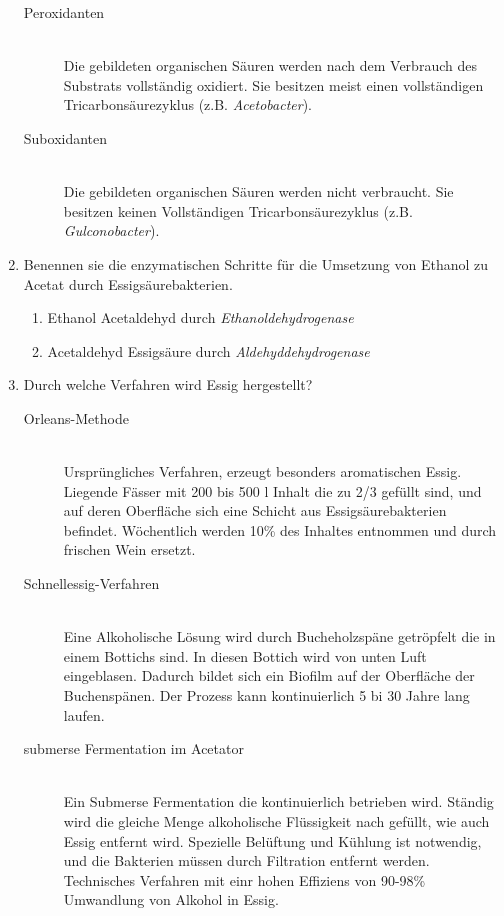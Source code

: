 \begin{enumerate}
		\begin{description}
			\item[Peroxidanten] \hfill \\
				Die gebildeten organischen Säuren werden nach dem Verbrauch des Substrats vollständig oxidiert.
				Sie besitzen meist einen vollständigen Tricarbonsäurezyklus (z.B. \emph{Acetobacter}).
			\item[Suboxidanten] \hfill \\
				Die gebildeten organischen Säuren werden nicht verbraucht.
				Sie besitzen keinen Vollständigen Tricarbonsäurezyklus (z.B. \emph{Gulconobacter}).
		\end{description}
		
	\item Benennen sie die enzymatischen Schritte für die Umsetzung von Ethanol zu Acetat durch Essigsäurebakterien.
		
		\begin{enumerate}[label=\arabic*)]
			\item Ethanol \textrightarrow Acetaldehyd durch \slshape{Ethanoldehydrogenase}
			\item Acetaldehyd \textrightarrow Essigsäure durch \slshape{Aldehyddehydrogenase}
		\end{enumerate}

	\item Durch welche Verfahren wird Essig hergestellt?
		
		\begin{description}
			\item[Orleans-Methode] \hfill \\
				Ursprüngliches Verfahren, erzeugt besonders aromatischen Essig.
				Liegende Fässer mit 200 bis 500 l Inhalt die zu 2/3 gefüllt sind,
				und auf deren Oberfläche sich eine Schicht aus Essigsäurebakterien befindet.
				Wöchentlich werden 10\% des Inhaltes entnommen
				und durch frischen Wein ersetzt.
			\item[Schnellessig-Verfahren] \hfill \\
				Eine Alkoholische Lösung wird durch Bucheholzspäne getröpfelt die in einem Bottichs sind.
				In diesen Bottich wird von unten Luft eingeblasen.
				Dadurch bildet sich ein Biofilm auf der Oberfläche der Buchenspänen.
				Der Prozess kann kontinuierlich 5 bi 30 Jahre lang laufen.
			\item[submerse Fermentation im Acetator] \hfill \\
				Ein Submerse Fermentation die kontinuierlich betrieben wird.
				Ständig wird die gleiche Menge alkoholische Flüssigkeit nach gefüllt,
				wie auch Essig entfernt wird.
				Spezielle Belüftung und Kühlung ist notwendig,
				und die Bakterien müssen durch Filtration entfernt werden.
				Technisches Verfahren mit einr hohen Effiziens von 90-98\% Umwandlung von
				Alkohol in Essig.
		\end{description}


\end{enumerate}
